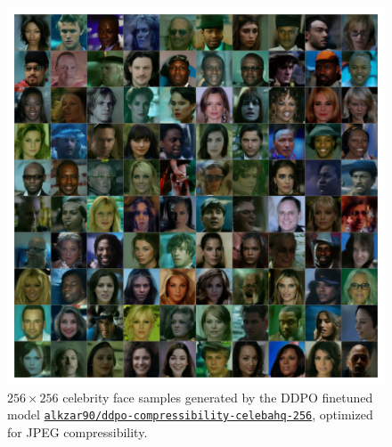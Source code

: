 \begin{appendixs}
        \begin{figure}
            \centering
            \includegraphics[scale=0.8]{img/results/ddpo-compressibility-samples.png}
            \vspace{-4pt}  %
            \captionsetup{width=\textwidth} %
            \caption{$256\times256$ celebrity face samples generated by the DDPO finetuned model \href{https://huggingface.co/alkzar90/ddpo-compressibility-celebahq-256}{\texttt{\texttt{alkzar90/ddpo-compressibility-celebahq-256}}}, optimized for JPEG compressibility.}
            \label{fig:ddpo-compressibility-samples}
        \end{figure}


\end{appendixs}
